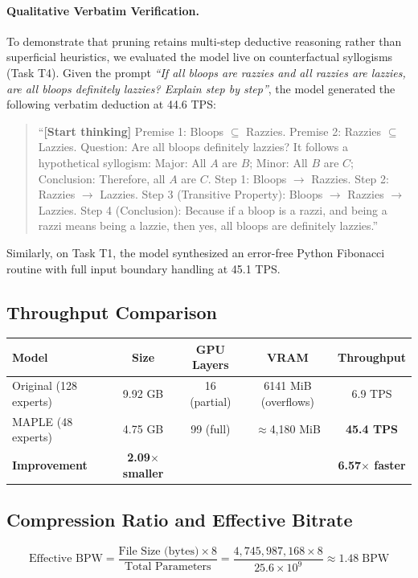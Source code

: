 \documentclass[10pt]{article}
\newcommand{\MAPLE}{\textsc{MAPLE}}
\newcommand{\bpw}{\text{BPW}}
\begin{document}
\paragraph{Qualitative Verbatim Verification.} To demonstrate that pruning retains multi-step deductive reasoning rather than superficial heuristics, we evaluated the model live on counterfactual syllogisms (Task T4). Given the prompt \textit{``If all bloops are razzies and all razzies are lazzies, are all bloops definitely lazzies? Explain step by step''}, the model generated the following verbatim deduction at 44.6 TPS:
\begin{quote}
\small
``\textbf{[Start thinking]} Premise 1: Bloops $\subseteq$ Razzies. Premise 2: Razzies $\subseteq$ Lazzies. Question: Are all bloops definitely lazzies? It follows a hypothetical syllogism: Major: All $A$ are $B$; Minor: All $B$ are $C$; Conclusion: Therefore, all $A$ are $C$. Step 1: Bloops $\rightarrow$ Razzies. Step 2: Razzies $\rightarrow$ Lazzies. Step 3 (Transitive Property): Bloops $\rightarrow$ Razzies $\rightarrow$ Lazzies. Step 4 (Conclusion): Because if a bloop is a razzi, and being a razzi means being a lazzie, then yes, all bloops are definitely lazzies.''
\end{quote}
Similarly, on Task T1, the model synthesized an error-free Python Fibonacci routine with full input boundary handling at 45.1 TPS.

\subsection{Throughput Comparison}

\begin{center}
\begin{tabular}{lcccc}
\toprule
\textbf{Model} & \textbf{Size} & \textbf{GPU Layers} & \textbf{VRAM} & \textbf{Throughput} \\
\midrule
Original (128 experts) & 9.92 GB & 16 (partial) & 6141 MiB (overflows) & 6.9 TPS \\
\MAPLE{} (48 experts) & 4.75 GB & 99 (full) & $\approx$4,180 MiB & \textbf{45.4 TPS} \\
\midrule
\textbf{Improvement} & \textbf{2.09$\times$ smaller} & & & \textbf{6.57$\times$ faster} \\
\bottomrule
\end{tabular}
\end{center}

\subsection{Compression Ratio and Effective Bitrate}
\begin{equation}
\text{Effective BPW} = \frac{\text{File Size (bytes)} \times 8}{\text{Total Parameters}} = \frac{4{,}745{,}987{,}168 \times 8}{25.6 \times 10^9} \approx \mathbf{1.48} \; \bpw
\end{equation}
\end{document}
